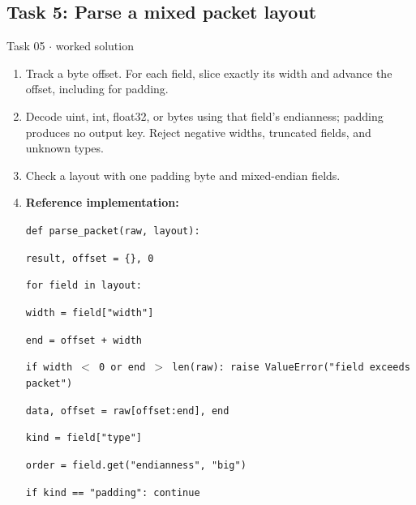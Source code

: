 \documentclass[11pt]{article}
\begin{document}
\begin{keepsection}\subsection{Task 5: Parse a mixed packet layout}

\begin{workedbox}{Task 05 \ensuremath{\cdot} worked solution}
\begin{enumerate}
\item Track a byte offset. For each field, slice exactly its width and advance the offset, including for padding.
\item Decode uint, int, float32, or bytes using that field’s endianness; padding produces no output key. Reject negative widths, truncated fields, and unknown types.
\item Check a layout with one padding byte and mixed-endian fields.
\item {}
\textbf{Reference implementation:}
\begin{tcolorbox}[colback=Paperblue,colframe=Paperblue,boxrule=0pt,arc=0pt,left=7pt,right=7pt,top=5pt,bottom=5pt]\small\sloppy
\noindent\hspace*{0em}\texttt{def parse\_packet(raw, layout):}\par
\noindent\hspace*{1em}\texttt{result, offset = \{\}, 0}\par
\noindent\hspace*{1em}\texttt{for field in layout:}\par
\noindent\hspace*{3em}\texttt{width = field["width"]}\par
\noindent\hspace*{3em}\texttt{end = offset + width}\par
\noindent\hspace*{3em}\texttt{if width \ensuremath{<} 0 or end \ensuremath{>} len(raw): raise ValueError("field exceeds packet")}\par
\noindent\hspace*{3em}\texttt{data, offset = raw[offset:end], end}\par
\noindent\hspace*{3em}\texttt{kind = field["type"]}\par
\noindent\hspace*{3em}\texttt{order = field.get("endianness", "big")}\par
\noindent\hspace*{3em}\texttt{if kind == "padding": continue}\par

\end{tcolorbox}
\end{enumerate}
\end{workedbox}
\end{keepsection}
\end{document}
